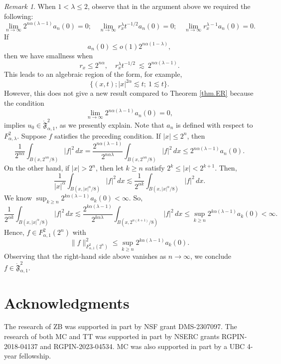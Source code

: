 \documentclass[11pt]{article}
\numberwithin{equation}{section}
\theoremstyle{remark}
\newtheorem{remark}[thm]{Remark}
\theoremstyle{definition}
\newcommand{\lec}{{\ \lesssim \ }}
\newcommand\al{\alpha}
\newcommand\la{\lambda}
\newcommand{\I}{\infty}
\newcommand{\EQ}[1]{\begin{equation} #1 \end{equation}}
\begin{document}
\begin{remark}
When $1<\lambda \leq 2$, observe that in the argument above we required the following:
\EQ{
\lim _{n\to \infty} 2^{n\al (\la-1)}a_n(0)=0;
\quad
\lim _{n\to \infty} r_x^\la t^{-1/2}a_n(0)=0;
\quad
\lim _{n\to \infty} r_x^{\la-1}a_n(0)=0.
}
If
\[
a_n(0) \le o(1) 2^{n\al(1-\la)},
\]
then we have smallness when
\[
r_x \le 2^{n \al}, \quad r_x^\la t^{-1/2} \lec 2^{n \al(\la-1)}.
\]
This leads to an algebraic region of the form,  {for example,}%
\[
\{ (x,t); |x|^{2\al} \lesssim t;\ 1\lesssim t   \}.
\]
However, this does not give a  new result compared to  Theorem  \ref{thm.ER} because  the condition \[
\lim _{n\to \infty} 2^{n\al (\la-1)}a_n(0)=0,
\]
implies $u_0 \in\mathring{ \mathfrak F}^2_{\al,1}$, as we presently explain.
 Note that  $a_n$ is defined with respect to $F^{2}_{\al,\la}$. Suppose $f$ satisfies the preceding condition. If   $|x|\leq 2^n$, then  
\[
\frac 1 {2^{n\al}}\int_{B(x,2^{\al n}/8)} |f|^2 \,dx= \frac {2^{n\al (\la-1)}} {2^{n\al \la }}  \int_{B(x,2^{\al n}/8)} |f|^2 \,dx \leq 2^{n\al (\la-1)}a_n(0).
\]
On the other hand, if 
$|x|>2^n$, then let $k\ge n$ satisfy $2^k\leq |x| <2^{k+1}$. 
Then,
\[
\frac 1 {|x|^\al} \int_{B(x,|x|^\al/8)}|f|^2\,dx \lesssim \frac 1 {2^{\al k}} \int_{B(x,|x|^\al/8)}|f|^2\,dx.
\]
We know  $\sup_{k\geq n}2^{k\al (\la-1)}a_k(0)<\I$. So, 
\[
\frac 1 {2^{\al k}} \int_{B(x,|x|^\al/8)}|f|^2\,dx \lesssim  \frac {2^{k\al (\la-1)}} {2^{k\al \la }}\int_{B(x,2^{\al (k+1)}/8)}|f|^2\,dx \leq \sup_{k\geq n}2^{k\al (\la-1)}a_k(0)  <\I.
\]
Hence, $f\in F^{2}_{\al,1}(2^n)$ with 
\EQ{
\| f \|^2_{F^{2}_{\al,1}(2^n)} \leq \sup_{k\geq n}2^{k\al (\la-1)}a_k(0).
}
Observing that the right-hand side above vanishes as $n\to \I$, we conclude  {$f\in\mathring{ \mathfrak F}^2_{\al,1}$.}
\end{remark}














%
\section*{Acknowledgments}
The research of ZB was supported in part by NSF grant DMS-2307097.
The research of both MC and TT was supported in part by
%
NSERC grants RGPIN-2018-04137 and RGPIN-2023-04534.
MC was also supported in part by a UBC 4-year fellowship.
\end{document}
